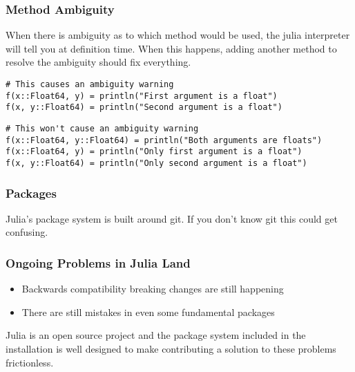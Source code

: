 \documentclass{beamer}
\begin{document}
\begin{frame}[fragile]
\frametitle{Method Ambiguity}

When there is ambiguity as to which method would be used, the julia interpreter
will tell you at definition time. When this happens, adding another method to 
resolve the ambiguity should fix everything.

\begin{verbatim}
# This causes an ambiguity warning
f(x::Float64, y) = println("First argument is a float")
f(x, y::Float64) = println("Second argument is a float")
\end{verbatim}

\begin{verbatim}
# This won't cause an ambiguity warning
f(x::Float64, y::Float64) = println("Both arguments are floats")
f(x::Float64, y) = println("Only first argument is a float")
f(x, y::Float64) = println("Only second argument is a float")
\end{verbatim}
\end{frame}

\begin{frame}
\frametitle{Packages}

Julia's package system is built around git. If you don't know git this could 
get confusing.

\end{frame}

\begin{frame}
\frametitle{Ongoing Problems in Julia Land}

\begin{itemize}
  \item Backwards compatibility breaking changes are still happening
  \item There are still mistakes in even some fundamental packages
\end{itemize}

Julia is an open source project and the package system included in the
installation is well designed to make contributing a solution to these 
problems frictionless.

\end{frame}
\end{document}
